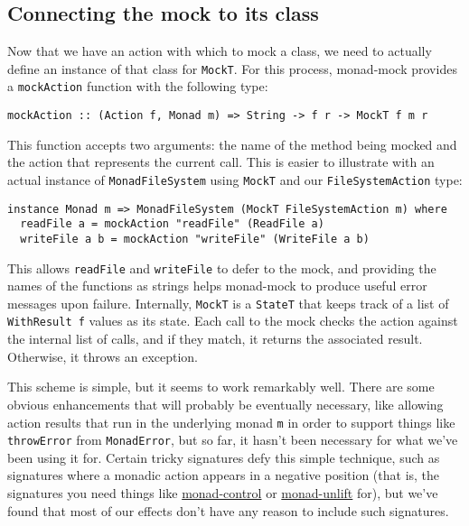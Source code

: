 \hypertarget{connecting-the-mock-to-its-class}{%
\subsection{Connecting the mock to its
class}\label{connecting-the-mock-to-its-class}}

Now that we have an action with which to mock a class, we need to
actually define an instance of that class for \texttt{MockT}. For this
process, monad-mock provides a \texttt{mockAction} function with the
following type:

\begin{verbatim}
mockAction :: (Action f, Monad m) => String -> f r -> MockT f m r
\end{verbatim}
This function accepts two arguments: the name of the method being mocked
and the action that represents the current call. This is easier to
illustrate with an actual instance of \texttt{MonadFileSystem} using
\texttt{MockT} and our \texttt{FileSystemAction} type:

\begin{verbatim}
instance Monad m => MonadFileSystem (MockT FileSystemAction m) where
  readFile a = mockAction "readFile" (ReadFile a)
  writeFile a b = mockAction "writeFile" (WriteFile a b)
\end{verbatim}
This allows \texttt{readFile} and \texttt{writeFile} to defer to the
mock, and providing the names of the functions as strings helps
monad-mock to produce useful error messages upon failure. Internally,
\texttt{MockT} is a \texttt{StateT} that keeps track of a list of
\texttt{WithResult\ f} values as its state. Each call to the mock checks
the action against the internal list of calls, and if they match, it
returns the associated result. Otherwise, it throws an exception.

This scheme is simple, but it seems to work remarkably well. There are
some obvious enhancements that will probably be eventually necessary,
like allowing action results that run in the underlying monad \texttt{m}
in order to support things like \texttt{throwError} from
\texttt{MonadError}, but so far, it hasn't been necessary for what we've
been using it for. Certain tricky signatures defy this simple technique,
such as signatures where a monadic action appears in a negative position
(that is, the signatures you need things like
\href{https://hackage.haskell.org/package/monad-control}{monad-control}
or \href{https://hackage.haskell.org/package/monad-unlift}{monad-unlift}
for), but we've found that most of our effects don't have any reason to
include such signatures.

